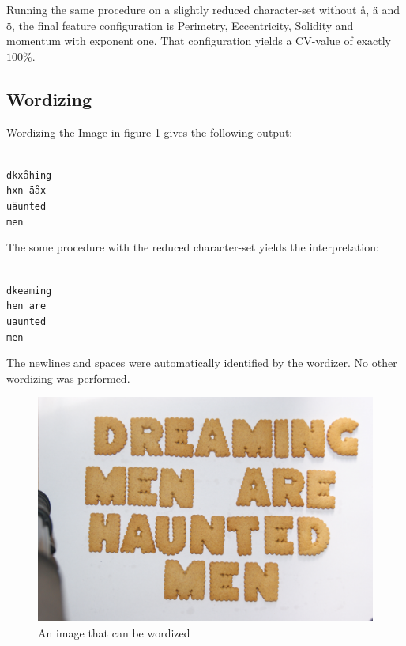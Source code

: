 \documentclass[a4paper,11pt]{article}
\begin{document}
Running the same procedure on a slightly reduced character-set without å, ä and ö,
the final feature configuration is Perimetry, Eccentricity, Solidity and momentum with exponent one.
That configuration yields a CV-value of exactly $100\%$. 

\subsection{Wordizing}
Wordizing the Image in figure \ref{fig:dreaming} gives the following output:

\texttt{ \\
dkxåhing \\
hxn äåx \\
uäunted \\
men \\
}

The some procedure with the reduced character-set yields the interpretation:

\texttt{ \\
dkeaming \\
hen are \\
uaunted \\
men \\
}

The newlines and spaces were automatically identified by the wordizer.
No other wordizing was performed.

\begin{figure}[]
\begin{center}
\includegraphics[width=140mm]{dreaming.JPG}
\end{center}
\caption{An image that can be wordized}
\label{fig:dreaming}
\end{figure}
\end{document}
